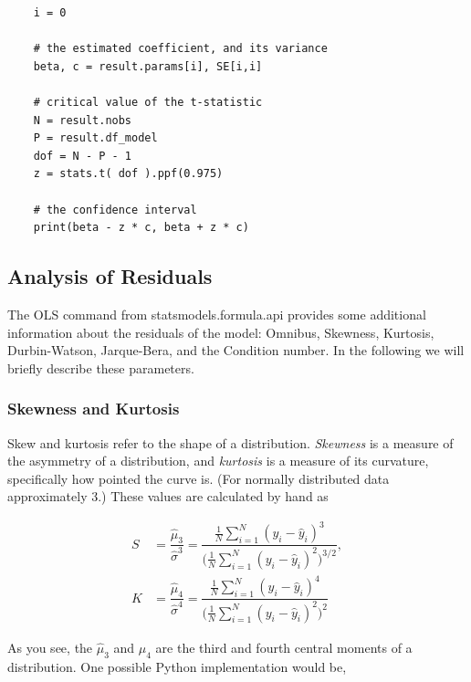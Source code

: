 \begin{lstlisting}
    i = 0

    # the estimated coefficient, and its variance
    beta, c = result.params[i], SE[i,i]

    # critical value of the t-statistic
    N = result.nobs
    P = result.df_model
    dof = N - P - 1
    z = stats.t( dof ).ppf(0.975)

    # the confidence interval
    print(beta - z * c, beta + z * c)
\end{lstlisting}

\subsection{Analysis of Residuals}

The \textsf{OLS} command from \textsf{statsmodels.formula.api} provides some additional information about the residuals of the model: Omnibus, Skewness, Kurtosis, Durbin-Watson, Jarque-Bera, and the Condition number. In the following we will briefly describe these parameters.

\subsubsection{Skewness and Kurtosis}

Skew and kurtosis refer to the shape of a distribution. \emph{Skewness} is a measure of the asymmetry of a distribution, and \emph{kurtosis} is a measure of its curvature, specifically how pointed the curve is. (For normally distributed data approximately 3.) These values are calculated by hand as

\begin{subequations}
\begin{align}
    S &= \dfrac{\hat{\mu}_{3}}{\hat{\sigma}^{3}} = \dfrac{ \frac{1}{N} \displaystyle \sum_{i=1}^{N} ( y_{i} - \hat{y}_{i} )^{3} }{ \biggl( \frac{1}{N} \displaystyle \sum_{i=1}^{N} ( y_{i} - \hat{y}_{i} )^{2} \biggr)^{3/2}}, \\
    K &= \dfrac{\hat{\mu}_{4}}{\hat{\sigma}^{4}} = \dfrac{ \frac{1}{N} \displaystyle \sum_{i=1}^{N} ( y_{i} - \hat{y}_{i} )^{4} }{ \biggl( \frac{1}{N} \displaystyle \sum_{i=1}^{N} ( y_{i} - \hat{y}_{i} )^{2} \biggr)^{2}}
\end{align}
\end{subequations}


As you see, the $\hat{\mu}_3$ and $\hat{\mu}_4$ are the third and fourth central moments of a distribution. One possible Python implementation would be,

